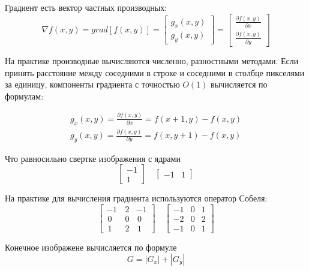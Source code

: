 \documentclass[oneside,final,14pt]{extreport}
\begin{document}
Градиент есть вектор частных производных:
\begin{equation}
\nabla f(x,y) 
= 
grad[f(x,y)]
=
\begin{bmatrix}
g_x(x,y)\\
g_y(x,y)
\end{bmatrix}
=
\begin{bmatrix}
\frac{\partial f(x,y)}
{\partial x}\\
\frac{\partial f(x,y)}
{\partial y}
\end{bmatrix}
\end{equation}

 На практике производные вычисляются численно, разностными методами. Если принять расстояние между соседними в строке и соседними в столбце пикселями за единицу, компоненты градиента с точностью $O(1)$ вычисляется по формулам:

\begin{gather}
g_x(x,y) 
= 
\frac{\partial f(x,y)}
{\partial x}
=
f(x+1,y) - f(x,y)
\\
g_y(x,y) 
= 
\frac{\partial f(x,y)}
{\partial y}
=
f(x,y+1) - f(x,y)
\end{gather}

Что равносильно свертке изображения \cite{Dup:coursache} с ядрами 
\begin{equation}
\begin{bmatrix}
-1\\1
\end{bmatrix}
\quad
\begin{bmatrix}
-1 & 1
\end{bmatrix}
\end{equation}

На практике для вычисления градиента используются оператор Собеля:
\vspace{3mm}
\begin{equation}
\begin{bmatrix}
 -1 & \,2 & -1 \\
\,0 & \,0 &\,0 \\
\,1 & \,2 &\,1
\end{bmatrix}
\quad
\begin{bmatrix}
-1 & 0 &  1 \\
-2 & 0 &  2 \\
-1 & 0 &  1
\end{bmatrix}	
\end{equation}

\vspace{3mm}Конечное изображене вычисляется 	по формуле
\begin{equation}
G
=
|G_x| + |G_y|
\end{equation}
\end{document}
